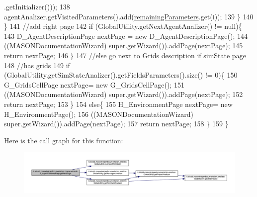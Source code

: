 \begin{DoxyCode}
      .getInitializer()));
138                 agentAnalizer.getVisitedParameters().add(\hyperlink{classit_1_1isislab_1_1masonhelperdocumentation_1_1mason_1_1wizards_1_1_f___agent_variables_page_ade36fab1c0254d3ac94c077a06fb75f2}{remainingParameters}.get(i));
139             \}
140         \}
141         \textcolor{comment}{//add right page}
142         \textcolor{keywordflow}{if} (GlobalUtility.getNextAgentAnalizer() != null)\{
143             D\_AgentDescriptionPage nextPage = \textcolor{keyword}{new} D\_AgentDescriptionPage();
144             ((MASONDocumentationWizard) super.getWizard()).addPage(nextPage);
145             \textcolor{keywordflow}{return} nextPage;
146         \}
147         \textcolor{comment}{//else go next to Grids description if simState page}
148         \textcolor{comment}{//has grids}
149         \textcolor{keywordflow}{if} (GlobalUtility.getSimStateAnalizer().getFieldsParameters().size() != 0)\{
150             G\_GridsCellPage nextPage= \textcolor{keyword}{new} G\_GridsCellPage();
151             ((MASONDocumentationWizard) super.getWizard()).addPage(nextPage); 
152             \textcolor{keywordflow}{return} nextPage; 
153         \}
154         \textcolor{keywordflow}{else}\{
155             H\_EnvironmentPage nextPage= \textcolor{keyword}{new} H\_EnvironmentPage();
156             ((MASONDocumentationWizard) super.getWizard()).addPage(nextPage); 
157             \textcolor{keywordflow}{return} nextPage; 
158         \}
159     \}
\end{DoxyCode}


Here is the call graph for this function\-:\nopagebreak
\begin{figure}[H]
\begin{center}
\leavevmode
\includegraphics[width=350pt]{classit_1_1isislab_1_1masonhelperdocumentation_1_1mason_1_1wizards_1_1_f___agent_variables_page_adb2fda5d8a33bb1cb27eda1854c5a89b_cgraph}
\end{center}
\end{figure}


